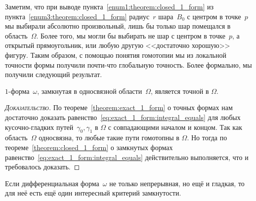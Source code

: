 \documentclass[../complex-analysis.tex]{subfiles}
\begin{document}
Заметим, что при выводе пункта~\ref{enum1:theorem:closed_1_form} из пункта~\ref{enum3:theorem:closed_1_form} радиус~$ r $ шара~$ B_0 $ с центром в точке~$ p $ мы выбирали абсолютно произвольный, лишь бы только шар помещался в область~$ \Omega $. Более того, мы могли бы выбирать не шар с центром в точке~$ p $, а открытый прямоугольник, или любую другую <<достаточно хорошую>> фигуру. Таким образом, с помощью понятия гомотопии мы из локальной точности формы получили почти-что глобальную точность. Более формально, мы получили следующий результат.

\begin{crly}
 \label{corollary:closed_form_is_exact_in_simply_connected}
 $ 1 $-форма~$ \omega $, замкнутая в односвязной области~$ \Omega $, является точной в $ \Omega $.
\end{crly}
\begin{proof}[\normalfont\textsc{Доказательство}]
 По теореме~\ref{theorem:exact_1_form} о точных формах нам достаточно доказать равенство~\eqref{eq:exact_1_form:integral_equals} для любых кусочно-гладких путей~$ \gamma_0, \gamma_1 $ в $ \Omega $ с совпадающими началом и концом. Так как область~$ \Omega $ односвязна, то любые такие пути гомотопны в $ \Omega $. Но тогда по теореме~\ref{theorem:closed_1_form} о замкнутых формах равенство~\eqref{eq:exact_1_form:integral_equals} действительно выполняется, что и требовалось доказать.
\end{proof}

Если дифференциальная форма~$ \omega $ не только непрерывная, но ещё и гладкая, то для неё есть ещё один интересный критерий замкнутости.
\end{document}
